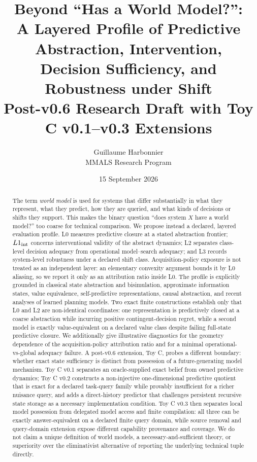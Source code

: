 \documentclass[10pt]{article}
\title{\textbf{Beyond ``Has a World Model?'':}\\
A Layered Profile of Predictive Abstraction, Intervention,\\
Decision Sufficiency, and Robustness under Shift\\[0.35em]
\large Post-v0.6 Research Draft with Toy C v0.1--v0.3 Extensions}
\author{Guillaume Harbonnier\\MMALS Research Program}
\date{15 September 2026}
\begin{document}
\maketitle

\begin{abstract}
The term \emph{world model} is used for systems that differ substantially in what they represent, what they predict, how they are queried, and what kinds of decisions or shifts they support. This makes the binary question ``does system $X$ have a world model?'' too coarse for technical comparison. We propose instead a declared, layered evaluation profile. L0 measures predictive closure at a stated abstraction frontier; $L1_{\rm int}$ concerns interventional validity of the abstract dynamics; L2 separates class-level decision adequacy from operational model--search adequacy; and L3 records system-level robustness under a declared shift class. Acquisition-policy exposure is not treated as an independent layer: an elementary convexity argument bounds it by L0 aliasing, so we report it only as an attribution ratio inside L0. The profile is explicitly grounded in classical state abstraction and bisimulation, approximate information states, value equivalence, self-predictive representations, causal abstraction, and recent analyses of learned planning models. Two exact finite constructions establish only that L0 and L2 are non-identical coordinates: one representation is predictively closed at a coarse abstraction while incurring positive contingent-decision regret, while a second model is exactly value-equivalent on a declared value class despite failing full-state predictive closure. We additionally give illustrative diagnostics for the geometry dependence of the acquisition-policy attribution ratio and for a minimal operational-vs-global adequacy failure. A post-v0.6 extension, Toy C, probes a different boundary: whether exact state sufficiency is distinct from possession of a future-generating model mechanism. Toy C v0.1 separates an oracle-supplied exact belief from owned predictive dynamics; Toy C v0.2 constructs a non-injective one-dimensional predictive quotient that is exact for a declared task-query family while provably insufficient for a richer nuisance query, and adds a direct-history predictor that challenges persistent recursive state storage as a necessary implementation condition. Toy C v0.3 then separates local model possession from delegated model access and finite compilation: all three can be exactly answer-equivalent on a declared finite query domain, while source removal and query-domain extension expose different capability provenance and coverage. We do not claim a unique definition of world models, a necessary-and-sufficient theory, or superiority over the eliminativist alternative of reporting the underlying technical tuple directly.
\end{abstract}
\end{document}
